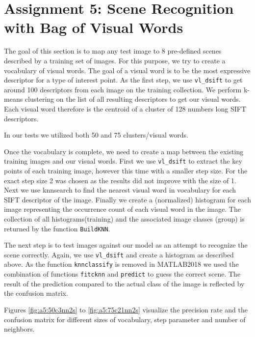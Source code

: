 \section{Assignment 5: Scene Recognition with Bag of Visual Words}

The goal of this section is to map any test image to 8 pre-defined scenes described by a training set of images. For this purpose, we try to create a vocabulary of visual words. The goal of a visual word is to be the most expressive descriptor for a type of interest point. As the first step, we use \texttt{vl\_dsift} to get around 100 descriptors from each image on the training collection. We perform k-means clustering on the list of all resulting descriptors to get our visual words. Each visual word therefore is the centroid of a cluster of 128 numbers long SIFT descriptors.


In our tests we utilized both 50 and 75 clusters/visual words.


Once the vocabulary is complete, we need to create a map between the existing training images and our visual words. First we use \texttt{vl\_dsift} to extract the key points of each training image, however this time with a smaller step size. For the exact step size 2 was chosen as the results did not improve with the size of 1. Next we use knnsearch to find the nearest visual word in vocabulary for each SIFT descriptor of the image. Finally we create a (normalized) histogram for each image representing the occurrence count of each visual word in the image. The collection of all histograms(training) and the associated image classes (group) is returned by the function \texttt{BuildKNN}.


The next step is to test images against our model as an attempt to recognize the scene correctly. Again, we use \texttt{vl\_dsift} and create a histogram as described above. As the function \texttt{knnclassify} is removed in MATLAB2018 we used the combination of functions \texttt{fitcknn} and \texttt{predict} to guess the correct scene. The result of the prediction compared to the actual class of the image is reflected by the confusion matrix.

Figures \ref{fig:a5:50c3nn2s} to \ref{fig:a5:75c21nn2s} visualize the precision rate and the confusion matrix for different sizes of vocabulary, step parameter and number of neighbors.


